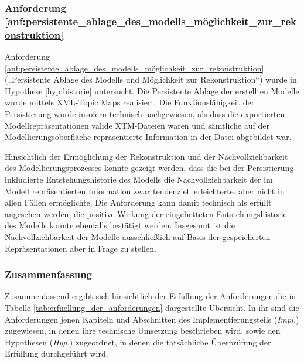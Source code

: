 \subsubsection{Anforderung \ref{anf:persistente_ablage_des_modells_möglichkeit_zur_rekonstruktion}}
Anforderung \ref{anf:persistente_ablage_des_modells_möglichkeit_zur_rekonstruktion} („Persistente Ablage des Modells und Möglichkeit zur Rekonstruktion“) wurde in Hypothese \ref{hyp:historie} untersucht. Die Persistente Ablage der erstellten Modelle wurde mittels XML-Topic Maps realisiert. Die Funktionsfähigkeit der Persistierung wurde insofern technisch nachgewiesen, als dass die exportierten Modellrepräsentationen valide \gls{XTM}-Dateien waren und sämtliche auf der Modellierungsoberfläche repräsentierte Information in der Datei abgebildet war. 

Hinsichtlich der Ermöglichung der Rekonstruktion und der Nachvollziehbarkeit des Modellierungsprozesses konnte gezeigt werden, dass die bei der Persistierung inkludierte Entstehungshistorie des Modells die Nachvollziehbarkeit der im Modell repräsentierten Information zwar tendenziell erleichterte, aber nicht in allen Fällen ermöglichte. Die Anforderung kann damit technisch als erfüllt angesehen werden, die positive Wirkung der eingebetteten Entstehungshistorie des Modells konnte ebenfalls bestätigt werden. Insgesamt ist die Nachvollziehbarkeit der Modelle ausschließlich auf Basis der gespeicherten Repräsentationen aber in Frage zu stellen.

\subsubsection{Zusammenfassung}
Zusammenfassend ergibt sich hinsichtlich der Erfüllung der Anforderungen die in Tabelle \ref{tab:erfuellung_der_anforderungen} dargestellte Übersicht. In ihr sind die Anforderungen jenen Kapiteln und Abschnitten des Implementierungsteils (\emph{Impl.}) zugewiesen, in denen ihre technische Umsetzung beschrieben wird, sowie den Hypothesen (\emph{Hyp.}) zugeordnet, in denen die tatsächliche Überprüfung der Erfüllung durchgeführt wird.

